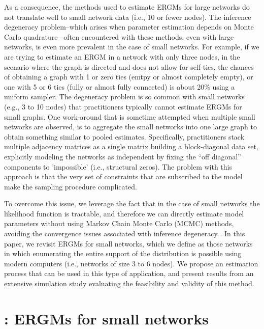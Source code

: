 \documentclass[12pt]{article}
\begin{document}
As a consequence, the methods used to estimate ERGMs for large networks do not translate well to small network data (i.e., 10 or fewer nodes). The inference degeneracy problem--which arises when parameter estimation depends on Monte Carlo quadrature \cite{Handcock2003}--often encountered with these methods, even with large networks, is even more prevalent in the case of small networks. For example, if we are trying to estimate an ERGM in a network with only three nodes, in the scenario where the graph is directed and does not allow for self-ties, the chances of obtaining a graph with 1 or zero ties (emtpy or almost completely empty), or one with 5 or 6 ties (fully or almost fully connected) is about 20\% using a uniform sampler. The degeneracy problem is so common with small networks (e.g., 3 to 10 nodes) that practitioners typically cannot estimate ERGMs for small graphs. One work-around that is sometime attempted when multiple small networks are observed, is to aggregate the small networks into one large graph to obtain something similar to pooled estimates. Specifically, practitioners stack multiple adjacency matrices as a single matrix  building a block-diagonal data set, explicitly modeling the networks as independent by fixing the ``off diagonal'' components to 'impossible' (i.e., structural zeros). The problem with this approach is that the very set of constraints that are subscribed to the model make the sampling procedure complicated. 

To overcome this issue, we leverage the fact that in the case of small networks the likelihood function is tractable, and therefore we can directly estimate model parameters without using Markov Chain Monte Carlo (MCMC) methods, avoiding the convergence issues associated with inference degeneracy \cite{Handcock2003}. In this paper, we revisit ERGMs for small networks, which we define as those networks in which enumerating the entire support of the distribution is possible using modern computers (i.e., networks of size 3 to 6 nodes). We propose an estimation process that can be used in this type of application, and present results from an extensive simulation study evaluating the feasibility and validity of this method.

\section{\ergmitos{}: ERGMs for small networks}
\end{document}

